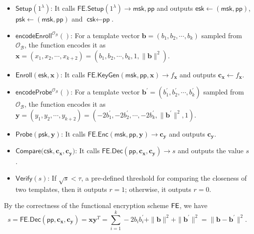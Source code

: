 \begin{itemize}

	\item $\textsf{Setup}(1^\lambda)$: It calls $\textsf{FE.Setup}(1^\lambda) \to \textsf{msk}, \textsf{pp}$ and outputs $\textsf{esk} \gets (\textsf{msk}, \textsf{pp})$, $\textsf{psk} \gets (\textsf{msk}, \textsf{pp})$ and $\textsf{csk} \gets \textsf{pp}$.

	\item $\textsf{encodeEnroll}^{\mathcal{O}_{\mathcal{B}}}()$: For a template vector $\mathbf{b} = (b_1, b_2, \cdots, b_k)$ sampled from $\mathcal{O}_{\mathcal{B}}$, the function encodes it as $\mathbf{x} = (x_1, x_2, \cdots, x_{k+2}) = (b_1, b_2, \cdots, b_k, 1, \|\mathbf{b}\|^2)$. 

	\item $\textsf{Enroll}(\textsf{esk}, \mathbf{x})$: It calls $\textsf{FE.KeyGen}(\textsf{msk}, \textsf{pp}, \mathbf{x}) \to f_\mathbf{x}$ and outputs $\mathbf{c_x} \gets f_\mathbf{x}$.

	\item $\textsf{encodeProbe}^{\mathcal{O}_{\mathcal{B}}}()$: For a template vector $\mathbf{b}^\prime = (b_1^\prime, b_2^\prime, \cdots, b_k^\prime)$ sampled from $\mathcal{O}_{\mathcal{B}}$, the function encodes it as $\mathbf{y} = (y_1, y_2, \cdots, y_{k+2}) = (-2b_1^\prime, -2b_2^\prime, \cdots, -2b_k^\prime, \|\mathbf{b}^\prime\|^2, 1)$.

	\item $\textsf{Probe}(\textsf{psk}, \mathbf{y})$: It calls $\textsf{FE.Enc}(\textsf{msk}, \textsf{pp}, \mathbf{y}) \to \mathbf{c_y}$ and outputs $\mathbf{c_y}$.

	\item $\textsf{Compare}(\textsf{csk}, \mathbf{c_x}, \mathbf{c_y)}$: It calls $\textsf{FE.Dec}(\textsf{pp}, \mathbf{c_x}, \mathbf{c_y}) \to s$ and outputs the value $s$.

	\item $\textsf{Verify}(s)$: If $\sqrt{s} < \tau$, a pre-defined threshold for comparing the closeness of two templates, then it outputs $r = 1$; otherwise, it outputs $r = 0$.

\end{itemize}

By the correctness of the functional encryption scheme $\sf FE$, we have
\[
	s = \textsf{FE.Dec}(\textsf{pp}, \mathbf{c_x}, \mathbf{c_y}) =  \mathbf{x} \mathbf{y}^T = \sum_{i=1}^k -2b_ib_i^\prime + \|\mathbf{b}\|^2 + \|\mathbf{b}^\prime\|^2 = \| \mathbf{b} - \mathbf{b}^\prime \|^2.
\]

